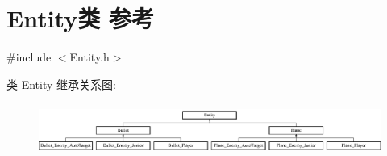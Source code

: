 \hypertarget{class_entity}{}\section{Entity类 参考}
\label{class_entity}


{\ttfamily \#include $<$Entity.\+h$>$}

类 Entity 继承关系图\+:\begin{figure}[H]
\begin{center}
\leavevmode
\includegraphics[height=1.686747cm]{class_entity}
\end{center}
\end{figure}
